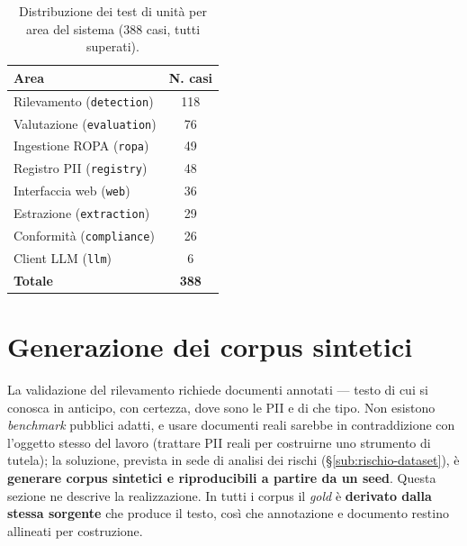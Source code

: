 \begin{table}
	\centering
	\caption{Distribuzione dei test di unità per area del sistema (388 casi, tutti superati).}
	\label{tab:test-unit}
	\small
	\begin{tabular}{|l|c|}
		\hline
		\textbf{Area}                     & \textbf{N. casi} \\
		\hline
		Rilevamento (\texttt{detection})  & 118              \\
		\hline
		Valutazione (\texttt{evaluation}) & 76               \\
		\hline
		Ingestione ROPA (\texttt{ropa})   & 49               \\
		\hline
		Registro PII (\texttt{registry})  & 48               \\
		\hline
		Interfaccia web (\texttt{web})    & 36               \\
		\hline
		Estrazione (\texttt{extraction})  & 29               \\
		\hline
		Conformità (\texttt{compliance})  & 26               \\
		\hline
		Client LLM (\texttt{llm})         & 6                \\
		\hline
		\textbf{Totale}                   & \textbf{388}     \\
		\hline
	\end{tabular}
\end{table}

\section{Generazione dei corpus sintetici}
\label{sec:generazione-corpus}

La validazione del rilevamento richiede documenti annotati --- testo di cui si conosca in anticipo, con certezza, dove sono le PII e di che tipo. Non esistono \textit{benchmark} pubblici adatti, e usare documenti reali sarebbe in contraddizione con l'oggetto stesso del lavoro (trattare PII reali per costruirne uno strumento di tutela); la soluzione, prevista in sede di analisi dei rischi (§\ref{sub:rischio-dataset}), è \textbf{generare corpus sintetici e riproducibili a partire da un seed}. Questa sezione ne descrive la realizzazione. In tutti i corpus il \textit{gold} è \textbf{derivato dalla stessa sorgente} che produce il testo, così che annotazione e documento restino allineati per costruzione.

